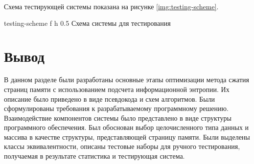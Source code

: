 Схема тестирующей системы показана на рисунке \ref{img:testing-scheme}.

    {testing-scheme}
    {f}
    {h}
    {0.5\textwidth}
    {Схема системы для тестирования}

\section*{Вывод}

В данном разделе были разработаны основные этапы оптимизации метода сжатия страниц памяти с использованием подсчета информационной энтропии. Их описание было приведено в виде псевдокода и схем алгоритмов. Были сформулированы требования к разрабатываемому программному решению. Взаимодействие компонентов системы было представлено в виде структуры программного обеспечения. Был обоснован выбор целочисленного типа данных и массива в качестве структуры, представляющей страницу памяти. Были выделены классы эквивалентности, описаны тестовые наборы для ручного тестирования, получаемая в результате статистика и тестирующая система.
